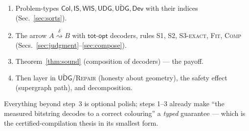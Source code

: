\documentclass[11pt]{article}
\theoremstyle{definition}
\newcommand{\rn}[1]{\textsc{\footnotesize #1}}
\newcommand{\redto}[1]{\mathrel{\overset{\textstyle #1}{\rightsquigarrow}}}
\newcommand{\Col}{\mathsf{Col}}
\newcommand{\IS}{\mathsf{IS}}
\newcommand{\WIS}{\mathsf{WIS}}
\newcommand{\UDG}{\mathsf{UDG}}
\newcommand{\UDGa}{\widetilde{\mathsf{UDG}}}
\newcommand{\Dev}{\mathsf{Dev}}
\newcommand{\totopt}{\mathsf{tot\text{-}opt}}
\begin{document}
\begin{enumerate}[leftmargin=1.5em,itemsep=2pt]
  \item Problem-types $\Col,\IS,\WIS,\UDG,\UDGa,\Dev$ with their indices
        (Sec.~\ref{sec:sorts}).
  \item The arrow $A\redto{\delta}B$ with $\totopt$ decoders, rules \rn{S1},
        \rn{S2}, \rn{S3-exact}, \rn{Fit}, \rn{Comp} (Secs.~\ref{sec:judgment}--\ref{sec:compose}).
  \item Theorem~\ref{thm:sound} (composition of decoders) --- the payoff.
  \item Then layer in $\UDGa$/\rn{Repair} (honesty about geometry),
        the safety effect (supergraph path), and decomposition.
\end{enumerate}

\noindent Everything beyond step~3 is optional polish; steps 1--3 already make
``the measured bitstring decodes to a correct colouring'' a \emph{typed}
guarantee --- which is the certified-compilation thesis in its smallest form.
\end{document}
